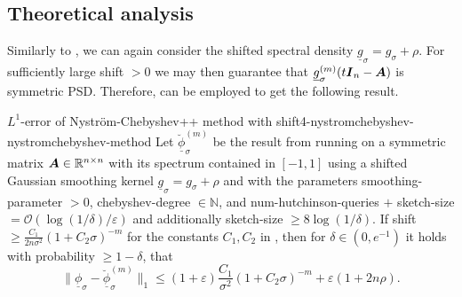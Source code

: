 
\subsection{Theoretical analysis}
\label{subsec:4-nystromchebyshev-analysis}


Similarly to , we can again consider
the shifted spectral density $\underline{g}_{\sigma} = g_{\sigma} + \rho$. For
sufficiently large \gls{shift} $> 0$ we may then guarantee that $\underline{g}_{\sigma}^{(m)}(t\boldsymbol{I}_n - \boldsymbol{A})$
is symmetric \gls{PSD}. Therefore,  can be
employed to get the following result.

\begin{theorem}{$L^1$-error of Nystr\"om-Chebyshev++ method with shift}{4-nystromchebyshev-nystromchebyshev-method}
    Let $\breve{\underline{\phi}}_{\sigma}^{(m)}$ be the result from running
     on a symmetric matrix
    $\boldsymbol{A} \in \mathbb{R}^{n \times n}$ with its spectrum contained in $[-1, 1]$
    using a shifted Gaussian smoothing kernel $\underline{g}_{\sigma} = g_{\sigma} + \rho$
    and with the parameters \gls{smoothing-parameter} $>0$, \gls{chebyshev-degree} $\in \mathbb{N}$, and
    \gls{num-hutchinson-queries} $+$ \gls{sketch-size} $=\mathcal{O}(\log(1/\delta)/\varepsilon)$
    and additionally \gls{sketch-size} $\geq 8 \log(1/\delta)$.
    If \gls{shift} $\geq \frac{C_1}{2 n \sigma^2} (1 + C_2 \sigma)^{-m}$ for the constants
    $C_1, C_2$ in , then
    for $\delta \in (0, e^{-1})$ it holds with probability $\geq 1-\delta$, that
    \begin{equation}
        \lVert \underline{\phi}_{\sigma} - \breve{\underline{\phi}}_{\sigma}^{(m)} \rVert _1
        \leq (1 + \varepsilon) \frac{C_1}{\sigma^2} (1 + C_2 \sigma)^{-m} + \varepsilon(1 + 2 n \rho).
    \end{equation}
\end{theorem}


